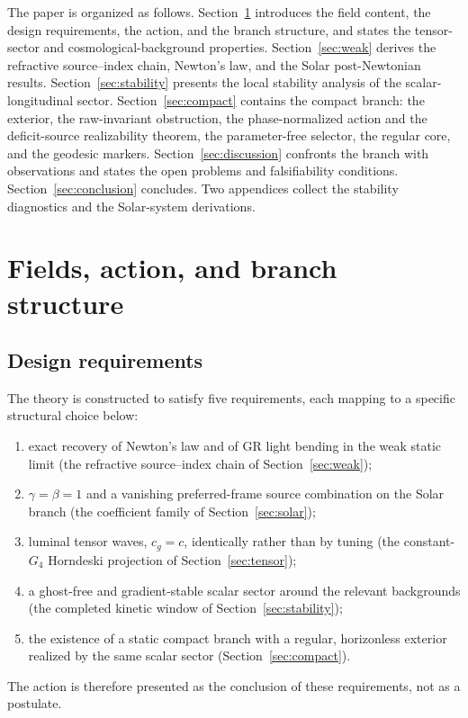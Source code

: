 \documentclass[12pt,a4paper]{article}
\begin{document}
The paper is organized as follows. Section~\ref{sec:theory} introduces the
field content, the design requirements, the action, and the branch structure,
and states the tensor-sector and cosmological-background properties.
Section~\ref{sec:weak} derives the refractive source--index chain, Newton's
law, and the Solar post-Newtonian results. Section~\ref{sec:stability}
presents the local stability analysis of the scalar-longitudinal sector.
Section~\ref{sec:compact} contains the compact branch: the exterior, the
raw-invariant obstruction, the phase-normalized action and the deficit-source
realizability theorem, the parameter-free selector, the regular core, and the
geodesic markers. Section~\ref{sec:discussion} confronts the branch with
observations and states the open problems and falsifiability conditions.
Section~\ref{sec:conclusion} concludes. Two appendices collect the stability
diagnostics and the Solar-system derivations.

\section{Fields, action, and branch structure}
\label{sec:theory}

\subsection{Design requirements}
\label{sec:design}

The theory is constructed to satisfy five requirements, each mapping to
a specific structural choice below:
\begin{enumerate}
\item exact recovery of Newton's law and of GR light bending in the weak
static limit (the refractive source--index chain of
Section~\ref{sec:weak});
\item $\gamma=\beta=1$ and a vanishing preferred-frame source combination on
the Solar branch (the coefficient family of Section~\ref{sec:solar});
\item luminal tensor waves, $c_g=c$, identically rather than by tuning (the
constant-$G_4$ Horndeski projection of Section~\ref{sec:tensor});
\item a ghost-free and gradient-stable scalar sector around the relevant
backgrounds (the completed kinetic window of Section~\ref{sec:stability});
\item the existence of a static compact branch with a regular, horizonless
exterior realized by the same scalar sector (Section~\ref{sec:compact}).
\end{enumerate}
The action is therefore presented as the conclusion of these requirements,
not as a postulate.
\end{document}
